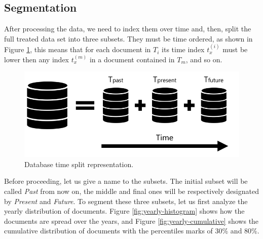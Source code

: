 \subsection{Segmentation}

After processing the data, we need to index them over time and, then, split the full treated data set into three subsets. They must be time ordered, as shown in Figure \ref{fig:database}, this means that for each document in $T_{i}$ its time index $t_{x}^{(i)}$ must be lower then any index $t_{x}^{(m)}$ in a document contained in $T_{m}$, and so on.

\begin{figure}[h!]
	\centering
	\includegraphics[width=0.6\linewidth]{01.Chapters/04.Materials/database}
	\caption{Database time split representation.}
	\label{fig:database}
\end{figure}

Before proceeding, let us give a name to the subsets. The initial subset will be called \textit{Past} from now on, the middle and final ones will be respectively designated by \textit{Present} and \textit{Future}. To segment these three subsets, let us first analyze the yearly distribution of documents. Figure \ref{fig:yearly-histogram} shows how the documents are spread over the years, and Figure \ref{fig:yearly-cumulative} shows the cumulative distribution of documents with the percentiles marks of 30\% and 80\%.

